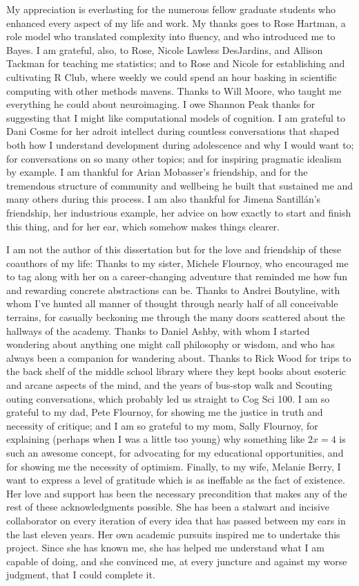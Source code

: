 {My appreciation is everlasting for the numerous fellow graduate students who enhanced every aspect of my life and work.
My thanks goes to Rose Hartman, a role model who translated complexity into fluency, and who introduced me to Bayes.
I am grateful, also, to Rose, Nicole Lawless DesJardins, and Allison Tackman for teaching me statistics; and to Rose and Nicole for establishing and cultivating R Club, where weekly we could spend an hour basking in scientific computing with other methods mavens.
Thanks to Will Moore, who taught me everything he could about neuroimaging.
I owe Shannon Peak thanks for suggesting that I might like computational models of cognition.
I am grateful to Dani Cosme for her adroit intellect during countless conversations that shaped both how I understand development during adolescence and why I would want to; for conversations on so many other topics; and for inspiring pragmatic idealism by example.
I am thankful for Arian Mobasser's friendship, and for the tremendous structure of community and wellbeing he built that sustained me and many others during this process.
I am also thankful for Jimena Santillán's friendship, her industrious example, her advice on how exactly to start and finish this thing, and for her ear, which somehow makes things clearer.

I am not the author of this dissertation but for the love and friendship of these coauthors of my life:
Thanks to my sister, Michele Flournoy, who encouraged me to tag along with her on a career-changing adventure that reminded me how fun and rewarding concrete abstractions can be.
Thanks to Andrei Boutyline, with whom I've hunted all manner of thought through nearly half of all conceivable terrains, for casually beckoning me through the many doors scattered about the hallways of the academy.
Thanks to Daniel Ashby, with whom I started wondering about anything one might call philosophy or wisdom, and who has always been a companion for wandering about.
Thanks to Rick Wood for trips to the back shelf of the middle school library where they kept books about esoteric and arcane aspects of the mind, and the years of bus-stop walk and Scouting outing conversations, which probably led us straight to Cog Sci 100.
I am so grateful to my dad, Pete Flournoy, for showing me the justice in truth and necessity of critique; and I am so grateful to my mom, Sally Flournoy, for explaining (perhaps when I was a little too young) why something like $2x=4$ is such an awesome concept, for advocating for my educational opportunities, and for showing me the necessity of optimism.
Finally, to my wife, Melanie Berry, I want to express a level of gratitude which is as ineffable as the fact of existence.
Her love and support has been the necessary precondition that makes any of the rest of these acknowledgments possible.
She has been a stalwart and incisive collaborator on every iteration of every idea that has passed between my ears in the last eleven years. 
Her own academic pursuits inspired me to undertake this project.
Since she has known me, she has helped me understand what I am capable of doing, and she convinced me, at every juncture and against my worse judgment, that I could complete it.

}
\dedication{
To who you are, and will never be.
To Ozymandias.
But most of all, to my wife, Melanie Berry.
}